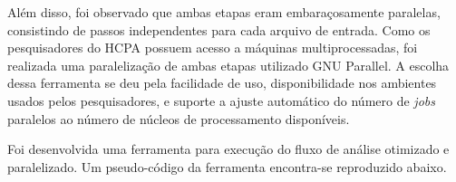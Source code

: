 \documentclass[cic,tc]{iiufrgs}
\begin{document}
Além disso, foi observado que ambas etapas eram embaraçosamente paralelas,
consistindo de passos independentes para cada arquivo de entrada. Como os
pesquisadores do HCPA possuem acesso a máquinas multiprocessadas, foi realizada
uma paralelização de ambas etapas utilizado GNU Parallel\cite{tange2011gnu}.  A
escolha dessa ferramenta se deu pela facilidade de uso, disponibilidade nos
ambientes usados pelos pesquisadores, e suporte a ajuste automático do número
de \textit{jobs} paralelos ao número de núcleos de processamento disponíveis.

Foi desenvolvida uma ferramenta para execução do fluxo de análise otimizado e
paralelizado. Um pseudo-código da ferramenta encontra-se reproduzido abaixo.

\begin{algorithmic}
  \For{CRAM EM
\end{algorithmic}


%
%
%



\end{document}

